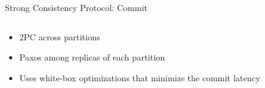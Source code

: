 \begin{frame}{Strong Consistency Protocol: Commit}
  \begin{center}
    \begin{columns}
    \end{columns}

    \vspace{1.00cm}
    \begin{itemize}
      \setlength{\itemsep}{8pt}
      \item 2PC across partitions
      \item Paxos among replicas of each partition
      \item Uses white-box optimizations that minimize the commit latency
    \end{itemize}
  \end{center}
\end{frame}
